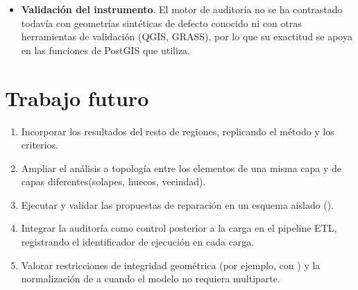\begin{itemize}[leftmargin=1.5em]
	\item \textbf{Validación del instrumento}. El motor de auditoría no se ha contrastado todavía con geometrías sintéticas de defecto conocido ni con otras herramientas de validación (QGIS, GRASS), por lo que su exactitud se apoya en las funciones de PostGIS que utiliza.
\end{itemize}

\section{Trabajo futuro}

\begin{enumerate}[leftmargin=1.5em]
	\item Incorporar los resultados del resto de regiones, replicando el método y los criterios.
	\item Ampliar el análisis a topología entre los elementos de una misma capa y de capas diferentes(solapes, huecos, vecindad).
	\item Ejecutar y validar las propuestas de reparación en un esquema aislado ().
	\item Integrar la auditoría como control posterior a la carga en el pipeline ETL, registrando el identificador de ejecución en cada carga.
	\item Valorar restricciones de integridad geométrica (por ejemplo,  con ) y la normalización de  a  cuando el modelo no requiera multiparte.
\end{enumerate}
